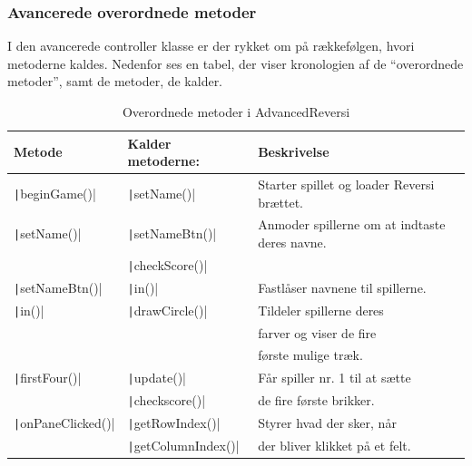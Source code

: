 \subsubsection{Avancerede overordnede metoder}\label{AOM}
I den avancerede controller klasse er der rykket om på rækkefølgen, hvori metoderne kaldes. Nedenfor ses en tabel, der viser kronologien af de ``overordnede metoder'', samt de metoder, de kalder.
\begin{table}[H]
    \centering
    \caption{Overordnede metoder i AdvancedReversi}\label{tbl:}
    \begin{tabular}{lll}
        \toprule
        Metode                             & Kalder metoderne:                   & Beskrivelse                                   \\
        \midrule
        \texttt|beginGame()|     & \texttt|setName()|        & Starter spillet og loader Reversi brættet.    \\
        \texttt|setName()|       & \texttt|setNameBtn()|     & Anmoder spillerne om at indtaste deres navne. \\
                                           & \texttt|checkScore()|     &                                               \\
        \texttt|setNameBtn()|    & \texttt|in()|             & Fastlåser navnene til spillerne.              \\
        \texttt|in()|            & \texttt|drawCircle()|     & Tildeler spillerne deres                      \\
                                           &                                     & farver og viser de fire                       \\
                                           &                                     & første mulige træk.                           \\
        \texttt|firstFour()|     & \texttt|update()|         & Får spiller nr. 1 til at sætte                \\
                                           & \texttt|checkscore()|     & de fire første brikker.                       \\
        \texttt|onPaneClicked()| & \texttt|getRowIndex()|    & Styrer hvad der sker, når                     \\
                                           & \texttt|getColumnIndex()| & der bliver klikket på et felt.                \\

\end{tabular}
\end{table}
